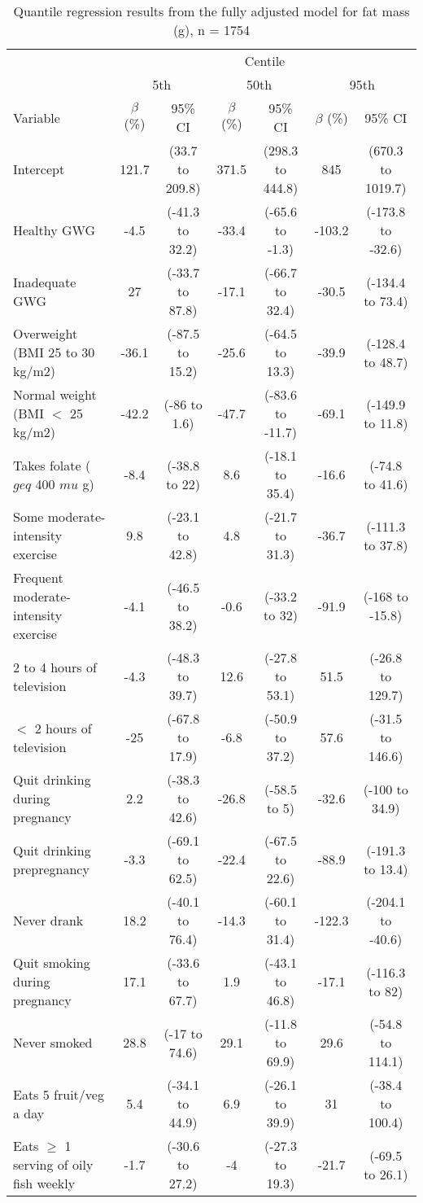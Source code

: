 \documentclass[10pt]{article}
\begin{document}
\begin{landscape}

\begin{table}
\begin{threeparttable}
\caption {Quantile regression results from the fully adjusted model for fat mass (g), n = 1754}
\begin{tabular}{lcccccc} 
\toprule
& \multicolumn{6}{c}{Centile} \\
& \multicolumn{2}{c}{5th} &  \multicolumn{2}{c}{50th} &  \multicolumn{2}{c}{95th} \\ 
\cmidrule(lr){2-7}
Variable & $\beta$ (\%) & 95\% CI & $\beta$ (\%)& 95\% CI & $\beta$ (\%)& 95\% CI \\
\cmidrule(lr){2-3}
\cmidrule(lr){4-5}
\cmidrule(lr){6-7}
Intercept & 121.7 & (33.7 to 209.8) & 371.5 & (298.3 to 444.8) & 845 & (670.3 to 1019.7)\\
Healthy GWG & -4.5 & (-41.3 to 32.2) & -33.4 & (-65.6 to -1.3) & -103.2 & (-173.8 to -32.6)\\
Inadequate GWG & 27 & (-33.7 to 87.8) & -17.1 & (-66.7 to 32.4) & -30.5 & (-134.4 to 73.4)\\
Overweight (BMI 25 to 30 kg/m2) & -36.1 & (-87.5 to 15.2) & -25.6 & (-64.5 to 13.3) & -39.9 & (-128.4 to 48.7)\\
Normal weight (BMI $<$ 25 kg/m2) & -42.2 & (-86 to 1.6) & -47.7 & (-83.6 to -11.7) & -69.1 & (-149.9 to 11.8)\\
Takes folate ($geq$ 400 $mu$ g) & -8.4 & (-38.8 to 22) & 8.6 & (-18.1 to 35.4) & -16.6 & (-74.8 to 41.6)\\
Some moderate-intensity exercise & 9.8 & (-23.1 to 42.8) & 4.8 & (-21.7 to 31.3) & -36.7 & (-111.3 to 37.8)\\
Frequent moderate-intensity exercise & -4.1 & (-46.5 to 38.2) & -0.6 & (-33.2 to 32) & -91.9 & (-168 to -15.8)\\
2 to 4 hours of television & -4.3 & (-48.3 to 39.7) & 12.6 & (-27.8 to 53.1) & 51.5 & (-26.8 to 129.7)\\
$<$ 2 hours of television & -25 & (-67.8 to 17.9) & -6.8 & (-50.9 to 37.2) & 57.6 & (-31.5 to 146.6)\\
Quit drinking during pregnancy & 2.2 & (-38.3 to 42.6) & -26.8 & (-58.5 to 5) & -32.6 & (-100 to 34.9)\\
Quit drinking prepregnancy & -3.3 & (-69.1 to 62.5) & -22.4 & (-67.5 to 22.6) & -88.9 & (-191.3 to 13.4)\\
Never drank & 18.2 & (-40.1 to 76.4) & -14.3 & (-60.1 to 31.4) & -122.3 & (-204.1 to -40.6)\\
Quit smoking during pregnancy & 17.1 & (-33.6 to 67.7) & 1.9 & (-43.1 to 46.8) & -17.1 & (-116.3 to 82)\\
Never smoked & 28.8 & (-17 to 74.6) & 29.1 & (-11.8 to 69.9) & 29.6 & (-54.8 to 114.1)\\
Eats 5 fruit/veg a day & 5.4 & (-34.1 to 44.9) & 6.9 & (-26.1 to 39.9) & 31 & (-38.4 to 100.4)\\
Eats $\geq$ 1 serving of oily fish weekly & -1.7 & (-30.6 to 27.2) & -4 & (-27.3 to 19.3) & -21.7 & (-69.5 to 26.1)\\




\end{tabular}
\end{threeparttable}
\end{table}
\end{landscape}
\end{document}
